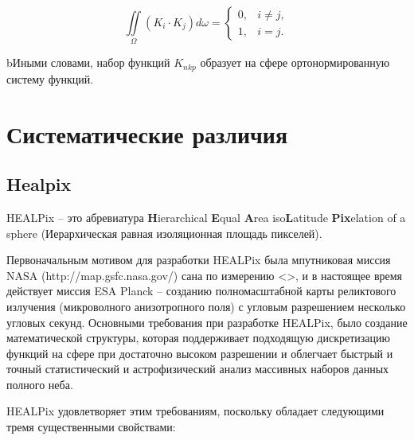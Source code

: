 \documentclass[14pt]{article} %
\begin{document}
\begin{equation}
\iint\limits_\Omega \left(K_i \cdot K_j \right) d\omega =  \left\{ \begin{array}{cc}
0, & i \neq j,\\
1, & i = j.
\end{array} \right.
\end{equation}

bИными словами, набор функций $K_{nkp}$ образует на сфере ортонормированную систему функций.






\section{Систематические различия}\label{sistem}
		

\subsection{Healpix}\label{sub:smthhealpix}
HEALPix -- это абревиатура \textbf{H}ierarchical \textbf{E}qual \textbf{A}rea iso\textbf{L}atitude \textbf{Pix}elation of a sphere (Иерархическая равная изоляционная площадь пикселей). 

Первоначальным мотивом для разработки HEALPix была мпутниковая миссия NASA (http://map.gsfc.nasa.gov/) сана по измерению <>, и в настоящее время действует миссия ESA Planck -- созданию полномасштабной карты реликтового излучения (микроволного анизотропного поля) с угловым разрешением несколько угловых секунд. Основными требования при разработке HEALPix, было создание математической структуры, которая поддерживает подходящую дискретизацию функций на сфере при достаточно высоком разрешении и облегчает быстрый и точный статистический и астрофизический анализ массивных наборов данных полного неба.

HEALPix удовлетворяет этим требованиям, поскольку обладает следующими тремя существенными свойствами:
\end{document}
